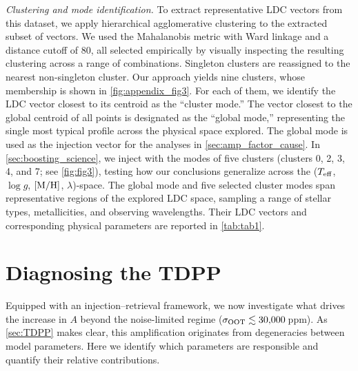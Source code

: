 \documentclass[twocolumn]{aastex631}
\newcommand{\vtwo}[1]{{#1}}
\begin{document}
\textit{Clustering and mode identification.} To extract representative LDC vectors from this dataset, we apply hierarchical agglomerative clustering \citep{Everitt2011} \vtwo{to the extracted subset of vectors}. We used the Mahalanobis metric with Ward linkage \citep{Ward1963} and a distance cutoff of $80$, all selected empirically by visually inspecting the resulting clustering across a range of combinations. Singleton clusters are reassigned to the nearest non-singleton cluster. Our approach yields nine clusters, whose membership is shown in \autoref{fig:appendix_fig3}. For each of them, we identify the LDC vector closest to its centroid as the ``cluster mode.'' The vector closest to the global centroid of all points is designated as the ``global mode,'' representing the single most typical profile across the physical space explored.
The global mode is used as the injection vector for the analyses in \autoref{sec:amp_factor_cause}. In \autoref{sec:boosting_science}, we inject with the modes of \vtwo{five clusters (clusters 0, 2, 3, 4, and 7}; see \autoref{fig:fig3}), testing how our conclusions generalize across the ($T_{\rm eff}$, $\log g$, $[\rm M/\rm H]$, $\lambda$)-space. \vtwo{The global mode and five selected cluster modes span representative regions of the explored LDC space, sampling a range of stellar types, metallicities, and observing wavelengths. Their LDC vectors and corresponding physical parameters are reported in \autoref{tab:tab1}.}

\section{Diagnosing the TDPP}\label{sec:amp_factor_cause}

Equipped with an injection--retrieval framework, we now investigate what drives the increase in $A$ beyond the noise-limited regime ($\sigma_{\rm OOT} \lesssim 30{,}000$\,ppm). As \autoref{sec:TDPP} makes clear, this amplification originates from degeneracies between model parameters. Here we identify which parameters are responsible and quantify their relative contributions.
\end{document}
